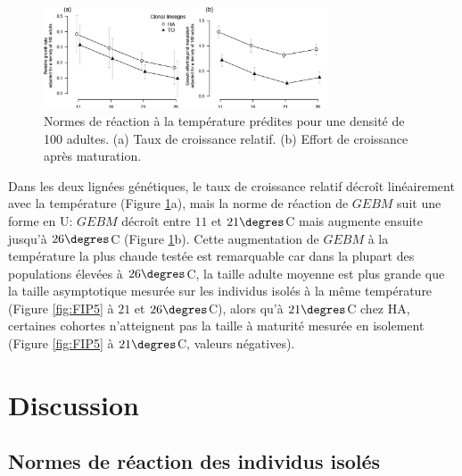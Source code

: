 \begin{figure}[!ht]
\begin{center}
\includegraphics[width=0.75\textwidth]{1_CorpsDeThese/Resumes/Fig/FIP07a}
\caption[Normes de réaction
prédites à la température]{Normes de réaction à la température prédites pour
une densité de 100 adultes. (a) Taux de croissance relatif. (b) Effort de
croissance après maturation.}
\label{fig:FIP7a}
\end{center}
\end{figure}

Dans les deux lignées génétiques, le taux de croissance relatif décroît
linéairement avec la température (Figure \ref{fig:FIP7a}a), mais la norme de
réaction de $GEBM$ suit une forme en U: $GEBM$ décroît entre $11$ et
$21\degres$C mais augmente ensuite jusqu'à $26\degres$C (Figure
\ref{fig:FIP7a}b). Cette augmentation de $GEBM$ à la température la plus chaude
testée est remarquable car dans la plupart des populations élevées à $26\degres$C, la
taille adulte moyenne est plus grande que la taille asymptotique mesurée sur les
individus isolés à la même température (Figure \ref{fig:FIP5} à $21$ et
$26\degres$C), alors qu'à $21\degres$C chez HA, certaines cohortes n'atteignent
pas la taille à maturité mesurée en isolement (Figure \ref{fig:FIP5} à
$21\degres$C, valeurs négatives).

\section{Discussion}

\subsection{Normes de réaction des individus isolés}

